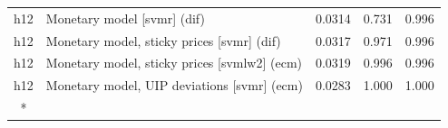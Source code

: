 \begin{ThreePartTable}
\begin{longtable}[t]{cp{5.5cm}ccc}
h12 & \raggedright Monetary model [svmr] (dif) & 0.0314 & 0.731 & 0.996\\
h12 & \raggedright Monetary model, sticky prices [svmr] (dif) & 0.0317 & 0.971 & 0.996\\
h12 & \raggedright Monetary model, sticky prices [svmlw2] (ecm) & 0.0319 & 0.996 & 0.996\\
h12 & \raggedright Monetary model, UIP deviations [svmr] (ecm) & 0.0283 & 1.000 & 1.000\\*
\end{longtable}
\end{ThreePartTable}
\endgroup{}

